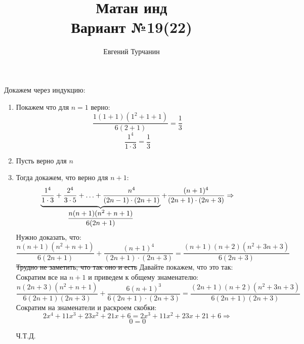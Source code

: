 \documentclass{report}
\title{\Huge{Матан инд}\\ Вариант №19(22)}
\author{\huge{Евгений Турчанин}}
\date{}
\begin{document}
\maketitle

\sol
Докажем через индукцию:\\
\begin{enumerate}
	\item Покажем что для $n=1$ верно: \\ 
		\begin{equation*}
		\dfrac{1(1+1)(1^2+1+1)}{6(2+1)}=\dfrac{1}{3}
		\end{equation*}
		\begin{equation*}
		\dfrac{1^4}{1\cdot3}=\dfrac{1}{3}
		\end{equation*}
	\item Пусть верно для $n$ \\
	\item Тогда докажем, что верно для $n+1$:
		\begin{equation*}
			\underbrace{\dfrac{1^4}{1\cdot3}+\dfrac{2^4}{3\cdot5}+\mathellipsis+\dfrac{n^4}{(2n-1)\cdot(2n+1)}}_{\dfrac{n(n+1)(n^2+n+1)}{6(2n+1)}}+\dfrac{(n+1)^4}{(2n+1)\cdot(2n+3)} \Rightarrow
		\end{equation*}
		Нужно доказать, что:
		\begin{equation*}
		\dfrac{n(n+1)(n^2+n+1)}{6(2n+1)}+\dfrac{(n+1)^4}{(2n+1)\cdot(2n+3)} = 
		\dfrac{(n+1)(n+2)(n^2+3n+3)}{6(2n+3)}
		\end{equation*}
		\sout{Трудно не заметить, что так оно и есть}
		Давайте покажем, что это так:\\
		Сократим все на $n+1$ и приведем к общему знаменателю:
		\begin{equation*}
		\dfrac{n(2n+3)(n^2+n+1)}{6(2n+1)(2n+3)}+\dfrac{6(n+1)^3}{6(2n+1)\cdot(2n+3)} = 
		\dfrac{(2n+1)(n+2)(n^2+3n+3)}{6(2n+1)(2n+3)}
		\end{equation*}
		Сократим на знаменатели и раскроем скобки:
		\begin{equation*}
		2x^4+11x^3+23x^2+21x+6=2x^3+11x^2+23x+21+6 \Rightarrow
		\end{equation*}
		\begin{equation*}
		0=0
		\end{equation*}
		\begin{center}
			Ч.Т.Д.
		\end{center}

\end{enumerate}
\end{document}
